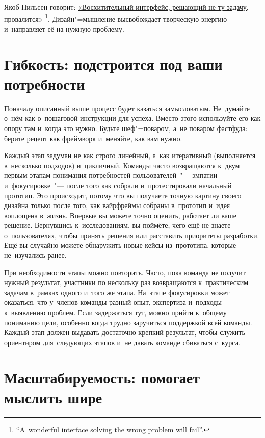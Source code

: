 \documentclass[12pt]{article}
\begin{document}
Якоб Нильсен говорит:
\href{%
	https://www.nngroup.com/articles/the-myth-of-the-genius-designer/%
}{%
	«Восхитительный интерфейс, решающий не ту
	задачу, провалится»%
}%
\footnote{%
	``A~wonderful interface solving the wrong problem will fail''.%
}.
Дизайн"=мышление высвобождает творческую энергию и~направляет её на нужную проблему.

\section{Гибкость: подстроится под ваши потребности}

Поначалу описанный выше процесс будет казаться замысловатым. Не~думайте о~нём как о~пошаговой инструкции для успеха. Вместо этого используйте его как опору там и~когда это нужно. Будьте шеф"=поваром, а~не поваром фастфуда: берите рецепт как фреймворк и~меняйте, как вам нужно.

Каждый этап задуман не как строго линейный, а~как итеративный (выполняется в~несколько подходов) и~цикличный. Команды часто возвращаются к~двум первым этапам понимания потребностей пользователей~"--- эмпатии и~фокусировке~"--- после того как собрали и~протестировали начальный прототип. Это происходит, потому что вы получаете точную картину своего дизайна только после того, как вайрфреймы собраны в~прототип и~идея воплощена в~жизнь. Впервые вы можете точно оценить, работает ли ваше решение. Вернувшись к~исследованиям, вы поймёте, чего ещё не знаете о~пользователях, чтобы принять решения или расставить приоритеты разработки. Ещё вы случайно можете обнаружить новые кейсы из~прототипа, которые не~изучались ранее.

При необходимости этапы можно повторить. Часто, пока команда не получит нужный результат, участники по нескольку раз возвращаются к~практическим задачам в~рамках одного и~того же этапа. На~этапе фокусировки может оказаться, что у~членов команды разный опыт, экспертиза и~подходы к~выявлению проблем. Если задержаться тут, можно прийти к~общему пониманию цели, особенно когда трудно заручиться поддержкой всей команды. Каждый этап должен выдавать достаточно крепкий результат, чтобы служить ориентиром для~следующих этапов и~не давать команде сбиваться с~курса.

\section{Масштабируемость: помогает мыслить шире}
\end{document}
